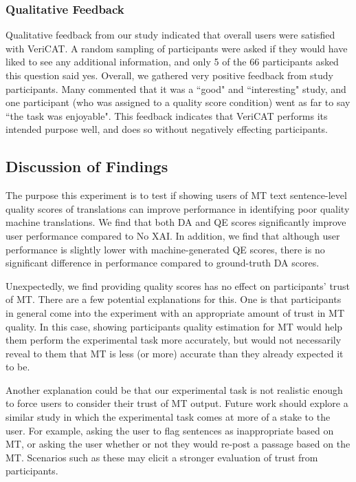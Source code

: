\subsubsection{Qualitative Feedback}

Qualitative feedback from our study indicated that overall users were satisfied with VeriCAT. A random sampling of participants were asked if they would have liked to see any additional information, and only 5 of the 66 participants asked this question said yes. Overall, we gathered very positive feedback from study participants. Many commented that it was a ``good" and ``interesting" study, and one participant (who was assigned to a quality score condition) went as far to say ``the task was enjoyable". This feedback indicates that VeriCAT performs its intended purpose well, and does so without negatively effecting participants.       

\subsection{Discussion of Findings} 

The purpose this experiment is to test if showing users of MT text sentence-level quality scores of translations can improve performance in identifying poor quality machine translations. We find that both DA and QE scores significantly improve user performance compared to No XAI. 
In addition, we find that although user performance is slightly lower with machine-generated QE scores, there is no significant difference in performance compared to ground-truth DA scores. 

Unexpectedly, we find providing quality scores has no effect on participants' trust of MT. There are a few potential explanations for this. One is that participants in general come into the experiment with an appropriate amount of trust in MT quality. In this case, showing participants quality estimation for MT would help them perform the experimental task more accurately, but would not necessarily reveal to them that MT is less (or more) accurate than they already expected it to be. 

Another explanation could be that our experimental task is not realistic enough to force users to consider their trust of MT output. Future work should explore a similar study in which the experimental task comes at more of a stake to the user. For example, asking the user to flag sentences as inappropriate based on MT, or asking the user whether or not they would re-post a passage based on the MT. Scenarios such as these may elicit a stronger evaluation of trust from participants.


